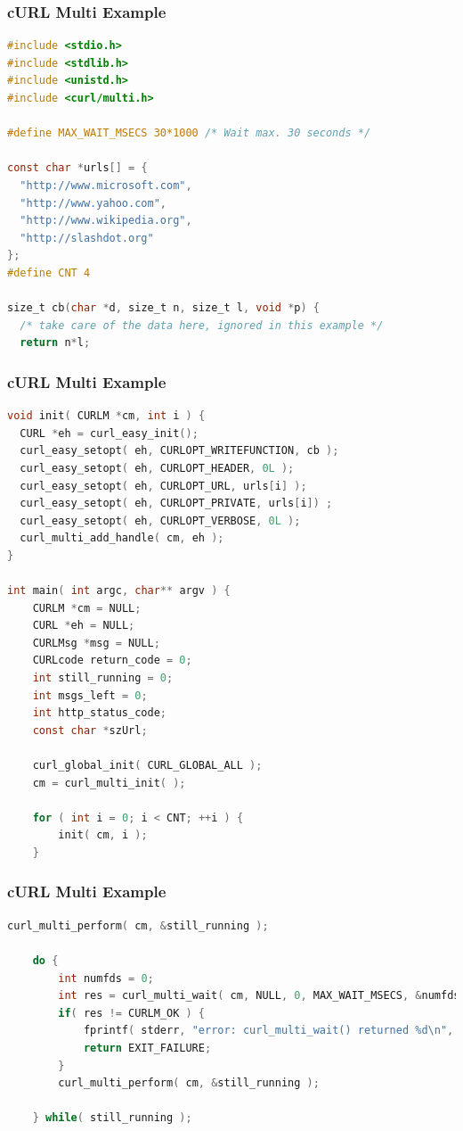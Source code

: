 \begin{frame}[fragile]
	\frametitle{cURL Multi Example}

	\begin{lstlisting}[language=C]
#include <stdio.h>
#include <stdlib.h>
#include <unistd.h>
#include <curl/multi.h>

#define MAX_WAIT_MSECS 30*1000 /* Wait max. 30 seconds */

const char *urls[] = {
  "http://www.microsoft.com",
  "http://www.yahoo.com",
  "http://www.wikipedia.org",
  "http://slashdot.org"
};
#define CNT 4

size_t cb(char *d, size_t n, size_t l, void *p) {
  /* take care of the data here, ignored in this example */
  return n*l;
\end{lstlisting}

\end{frame}

\begin{frame}[fragile]
	\frametitle{cURL Multi Example}

	\begin{lstlisting}[language=C]
void init( CURLM *cm, int i ) {
  CURL *eh = curl_easy_init();
  curl_easy_setopt( eh, CURLOPT_WRITEFUNCTION, cb );
  curl_easy_setopt( eh, CURLOPT_HEADER, 0L );
  curl_easy_setopt( eh, CURLOPT_URL, urls[i] );
  curl_easy_setopt( eh, CURLOPT_PRIVATE, urls[i]) ;
  curl_easy_setopt( eh, CURLOPT_VERBOSE, 0L );
  curl_multi_add_handle( cm, eh );
}

int main( int argc, char** argv ) {
    CURLM *cm = NULL;
    CURL *eh = NULL;
    CURLMsg *msg = NULL;
    CURLcode return_code = 0;
    int still_running = 0; 
    int msgs_left = 0;
    int http_status_code;
    const char *szUrl;

    curl_global_init( CURL_GLOBAL_ALL );
    cm = curl_multi_init( );
    
    for ( int i = 0; i < CNT; ++i ) {
        init( cm, i );
    }
\end{lstlisting}

\end{frame}

\begin{frame}[fragile]
	\frametitle{cURL Multi Example}

	\begin{lstlisting}[language=C]
    curl_multi_perform( cm, &still_running );

    do {
        int numfds = 0;
        int res = curl_multi_wait( cm, NULL, 0, MAX_WAIT_MSECS, &numfds );
        if( res != CURLM_OK ) {
            fprintf( stderr, "error: curl_multi_wait() returned %d\n", res );
            return EXIT_FAILURE;
        }
        curl_multi_perform( cm, &still_running );

    } while( still_running );
\end{lstlisting}

\end{frame}

